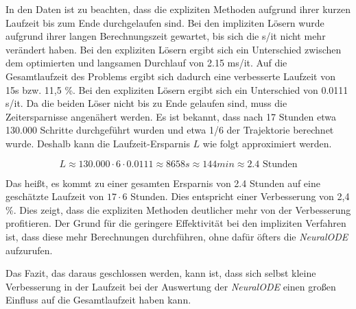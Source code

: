 In den Daten ist zu beachten, dass die expliziten Methoden aufgrund ihrer kurzen Laufzeit bis zum Ende durchgelaufen sind.
Bei den impliziten Lösern wurde aufgrund ihrer langen Berechnungszeit gewartet, bis sich die s/it nicht mehr verändert haben.
Bei den expliziten Lösern ergibt sich ein Unterschied zwischen dem optimierten und langsamen Durchlauf von 2.15 ms/it.
Auf die Gesamtlaufzeit des Problems ergibt sich dadurch eine verbesserte Laufzeit von 15s bzw. 11,5 \%.
Bei den expliziten Lösern ergibt sich ein Unterschied von 0.0111 s/it.
Da die beiden Löser nicht bis zu Ende gelaufen sind, muss die Zeitersparnisse angenähert werden.
Es ist bekannt, dass nach 17 Stunden etwa 130.000 Schritte durchgeführt wurden und etwa 1/6 der Trajektorie berechnet wurde.
Deshalb kann die Laufzeit-Ersparnis $L$ wie folgt approximiert werden.

$$
L \approx 130.000 \cdot 6 \cdot 0.0111 \approx 8658s \approx 144 min \approx 2.4 \text{ Stunden} 
$$

Das heißt, es kommt zu einer gesamten Ersparnis von 2.4 Stunden auf eine geschätzte Laufzeit von $17 \cdot 6 $ Stunden.
Dies entspricht einer Verbesserung von 2,4 \%.
Dies zeigt, dass die expliziten Methoden deutlicher mehr von der Verbesserung profitieren.
Der Grund für die geringere Effektivität bei den impliziten Verfahren ist, dass diese mehr Berechnungen durchführen, ohne dafür öfters 
die \textit{NeuralODE} aufzurufen.

Das Fazit, das daraus geschlossen werden, kann ist, dass sich selbst kleine Verbesserung in der Laufzeit 
bei der Auswertung der \textit{NeuralODE} einen großen Einfluss auf die Gesamtlaufzeit haben kann.



